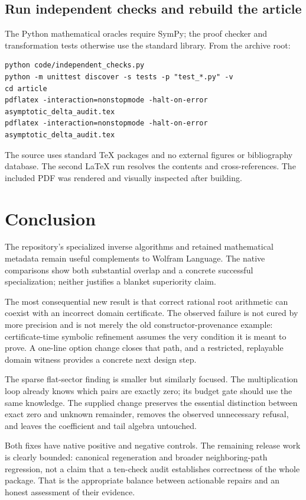 \documentclass[11pt,a4paper]{article}
\begin{document}
\subsection{Run independent checks and rebuild the article}
The Python mathematical oracles require SymPy; the proof checker and transformation tests otherwise use the standard library. From the archive root:
\begin{lstlisting}
python code/independent_checks.py
python -m unittest discover -s tests -p "test_*.py" -v
cd article
pdflatex -interaction=nonstopmode -halt-on-error asymptotic_delta_audit.tex
pdflatex -interaction=nonstopmode -halt-on-error asymptotic_delta_audit.tex
\end{lstlisting}
The source uses standard TeX packages and no external figures or bibliography database. The second LaTeX run resolves the contents and cross-references. The included PDF was rendered and visually inspected after building.

\section{Conclusion}
The repository's specialized inverse algorithms and retained mathematical metadata remain useful complements to Wolfram Language. The native comparisons show both substantial overlap and a concrete successful specialization; neither justifies a blanket superiority claim.

The most consequential new result is that correct rational root arithmetic can coexist with an incorrect domain certificate. The observed failure is not cured by more precision and is not merely the old constructor-provenance example: certificate-time symbolic refinement assumes the very condition it is meant to prove. A one-line option change closes that path, and a restricted, replayable domain witness provides a concrete next design step.

The sparse flat-sector finding is smaller but similarly focused. The multiplication loop already knows which pairs are exactly zero; its budget gate should use the same knowledge. The supplied change preserves the essential distinction between exact zero and unknown remainder, removes the observed unnecessary refusal, and leaves the coefficient and tail algebra untouched.

Both fixes have native positive and negative controls. The remaining release work is clearly bounded: canonical regeneration and broader neighboring-path regression, not a claim that a ten-check audit establishes correctness of the whole package. That is the appropriate balance between actionable repairs and an honest assessment of their evidence.
\end{document}
